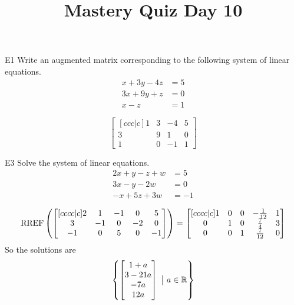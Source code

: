 \documentclass{sbgLAquiz}
\title{Mastery Quiz Day 10 }
\begin{document}
\begin{problem}{E1}
Write an augmented matrix corresponding to the following system of linear equations.
\begin{align*}
x+3y-4z &= 5 \\
3x+9y+z &= 0 \\
x-z &= 1
\end{align*}
\end{problem}
\begin{solution}
\[
\begin{bmatrix}[ccc|c]
1 & 3 & -4 & 5 \\
3 & 9 & 1 & 0 \\
1 & 0 & -1 & 1
\end{bmatrix}
\]
\end{solution}

\begin{problem}{E3}
Solve the system of linear equations.
\begin{align*}
2x+y-z+w &=5 \\
3x-y-2w &= 0 \\
-x+5z+3w&=-1
\end{align*}
\end{problem}
\begin{solution}
$$\operatorname{RREF}\left( \begin{bmatrix}[cccc|c] 2 & 1 & -1 & 0 & 5 \\ 3 & -1 & 0 & -2 & 0 \\ -1 & 0 & 5 & 0 & -1 \end{bmatrix} \right) = \begin{bmatrix}[cccc|c] 1 & 0 & 0 & -\frac{1}{12} & 1 \\ 0 & 1 & 0 & \frac{7}{4} & 3 \\ 0 & 0 & 1 & \frac{7}{12} & 0 \end{bmatrix}$$
So the solutions are $$\left\{ \begin{bmatrix} 1+a \\ 3-21a \\ -7a \\ 12a \end{bmatrix}\ \big|\ a \in \mathbb{R}\right\}$$
\end{solution}
\end{document}
